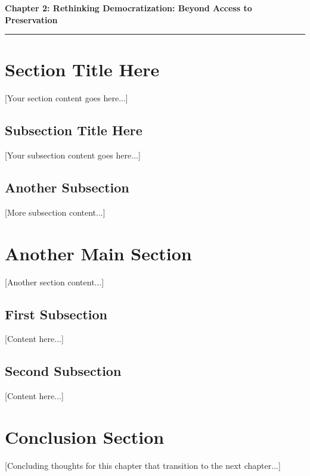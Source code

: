 \clearpage
\setcounter{chapter}{2}
\setcounter{section}{0}


\pagestyle{fancy}
\fancyhf{} %
\fancyfoot[C]{\thepage} %
\renewcommand{\headrulewidth}{0pt}
\renewcommand{\footrulewidth}{0pt}

\noindent
{\Large\textbf{Chapter 2: Rethinking Democratization: Beyond Access to Preservation}}
\vspace{0.3cm}
\hrule
\vspace{0.8cm}
\label{ch:democratization}

\setlength{\parindent}{0pt}



\section{Section Title Here}

[Your section content goes here...]

\subsection{Subsection Title Here}

[Your subsection content goes here...]

\subsection{Another Subsection}

[More subsection content...]

\section{Another Main Section}

[Another section content...]

\subsection{First Subsection}

[Content here...]

\subsection{Second Subsection}

[Content here...]

\section{Conclusion Section}

[Concluding thoughts for this chapter that transition to the next chapter...]